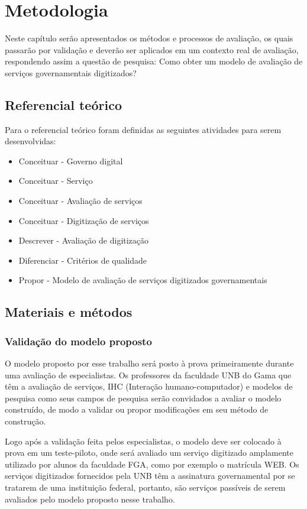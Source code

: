 \chapter[Metodologia]{Metodologia}
Neste capítulo serão apresentados os métodos e processos de avaliação, os quais passarão por validação e deverão ser aplicados em um contexto real de avaliação, respondendo assim a questão de pesquisa: Como obter um modelo de avaliação de serviços governamentais digitizados?

\section{Referencial teórico}

Para o referencial teórico foram definidas as seguintes atividades para serem desenvolvidas:

\begin{itemize}
\item 	Conceituar - Governo digital
\item	Conceituar - Serviço
\item	Conceituar - Avaliação de serviços
\item	Conceituar - Digitização de serviços
\item	Descrever - Avaliação de digitização
\item	Diferenciar - Critérios de qualidade
\item 	Propor - Modelo de avaliação de serviços digitizados governamentais
\end{itemize}

\section{Materiais e métodos}
	\subsection{Validação do modelo proposto}
	O modelo proposto por esse trabalho será posto à prova primeiramente durante uma avaliação de especialistas. Os professores da faculdade UNB do Gama que têm a avaliação de serviços, IHC (Interação humano-computador) e modelos de pesquisa como seus campos de pesquisa serão convidados a avaliar o modelo construído, de modo a validar ou propor modificações em seu método de construção.

	Logo após a validação feita pelos especialistas, o modelo deve ser colocado à prova em um teste-piloto, onde será avaliado um serviço digitizado amplamente utilizado por alunos da faculdade FGA, como por exemplo o matrícula WEB. Os serviços digitizados fornecidos pela UNB têm a assinatura governamental por se tratarem de uma instituição federal, portanto, são serviços passíveis de serem avaliados pelo modelo proposto nesse trabalho.

